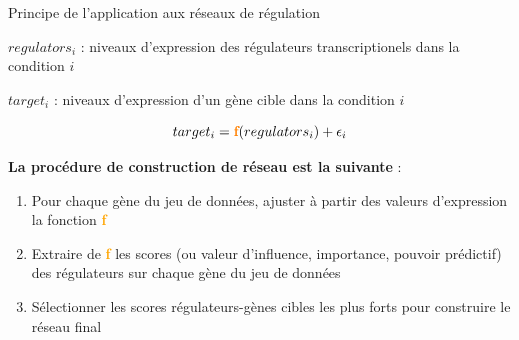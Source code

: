 	
	\begin{frame}{Principe de l'application aux réseaux de régulation}
    	
    	\begin{center}
    	\scriptsize 
    	$regulators_{i}$ : niveaux d'expression des régulateurs transcriptionels dans la condition $i$
    	
    	$target_{i}$  : niveaux d'expression d'un gène cible dans la condition $i$
    	\end{center}
    	\vspace{-0.15cm}
    	
    	
    	\begin{block}{}
    	\begin{equation*}
    	    target_{i} = \textcolor{orange}{\textbf{f}}(regulators_{i}) + \epsilon_i
    	\end{equation*}
    	\end{block}
    	\vspace{0.25cm}

    	\scriptsize 
    	
    	
    	\textbf{La procédure de construction de réseau est la suivante} : 
    	
    	\begin{enumerate}
    	    \item Pour chaque gène du jeu de données, ajuster à partir des valeurs d'expression la fonction \textcolor{orange}{\textbf{f}}
    	    \item Extraire de \textcolor{orange}{\textbf{f}} les scores (ou valeur d'influence, importance, pouvoir prédictif) des régulateurs sur chaque gène du jeu de données 
    	    \item Sélectionner les scores régulateurs-gènes cibles les plus forts pour construire le réseau final
    	\end{enumerate}
    	
	\end{frame}
	
